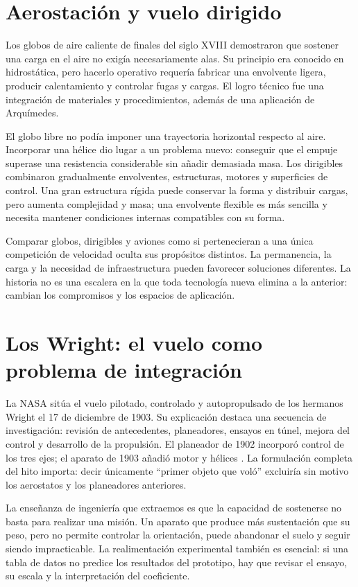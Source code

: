 \section{Aerostación y vuelo dirigido}
Los globos de aire caliente de finales del siglo XVIII demostraron que sostener una carga en el aire no exigía necesariamente alas. Su principio era conocido en hidrostática, pero hacerlo operativo requería fabricar una envolvente ligera, producir calentamiento y controlar fugas y cargas. El logro técnico fue una integración de materiales y procedimientos, además de una aplicación de Arquímedes.

El globo libre no podía imponer una trayectoria horizontal respecto al aire. Incorporar una hélice dio lugar a un problema nuevo: conseguir que el empuje superase una resistencia considerable sin añadir demasiada masa. Los dirigibles combinaron gradualmente envolventes, estructuras, motores y superficies de control. Una gran estructura rígida puede conservar la forma y distribuir cargas, pero aumenta complejidad y masa; una envolvente flexible es más sencilla y necesita mantener condiciones internas compatibles con su forma.

Comparar globos, dirigibles y aviones como si pertenecieran a una única competición de velocidad oculta sus propósitos distintos. La permanencia, la carga y la necesidad de infraestructura pueden favorecer soluciones diferentes. La historia no es una escalera en la que toda tecnología nueva elimina a la anterior: cambian los compromisos y los espacios de aplicación.

\section{Los Wright: el vuelo como problema de integración}
La NASA sitúa el vuelo pilotado, controlado y autopropulsado de los hermanos Wright el 17 de diciembre de 1903. Su explicación destaca una secuencia de investigación: revisión de antecedentes, planeadores, ensayos en túnel, mejora del control y desarrollo de la propulsión. El planeador de 1902 incorporó control de los tres ejes; el aparato de 1903 añadió motor y hélices \cite{NASA-BGA}. La formulación completa del hito importa: decir únicamente ``primer objeto que voló'' excluiría sin motivo los aerostatos y los planeadores anteriores.

La enseñanza de ingeniería que extraemos es que la capacidad de sostenerse no basta para realizar una misión. Un aparato que produce más sustentación que su peso, pero no permite controlar la orientación, puede abandonar el suelo y seguir siendo impracticable. La realimentación experimental también es esencial: si una tabla de datos no predice los resultados del prototipo, hay que revisar el ensayo, su escala y la interpretación del coeficiente.

